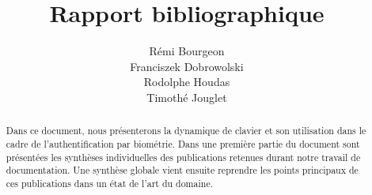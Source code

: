 








\title{Rapport bibliographique}
\author{Rémi Bourgeon\\
Franciszek Dobrowolski\\
Rodolphe Houdas\\
Timothé Jouglet}





\maketitle
\newpage
\tableofcontents
\newpage


\begin{abstract}
Dans ce document, nous présenterons la dynamique de clavier et son utilisation dans le cadre de l'authentification par biométrie. Dans une première partie du document sont présentées les synthèses individuelles des publications retenues durant notre travail de documentation. Une synthèse globale vient ensuite reprendre les points principaux de ces publications dans un état de l'art du domaine.
\end{abstract}

\newpage





